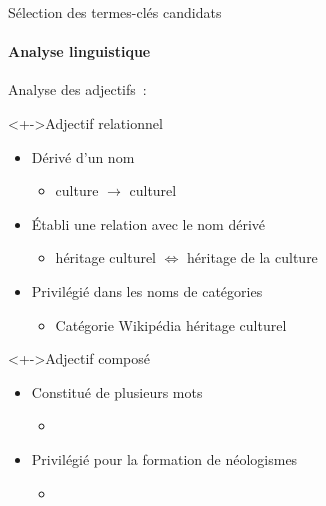   \begin{frame}[t]{Sélection des termes-clés candidats}\framesubtitle{Analyse linguistique}
    Analyse des adjectifs~:

    \begin{block}<+->{Adjectif relationnel}
      \begin{itemize}
        \item{Dérivé d'un nom}
        \begin{itemize}
          \item{\og{}culture\fg{} $\rightarrow$ \og{}culturel\fg{}}
        \end{itemize}
        \item{Établi une relation avec le nom dérivé}
        \begin{itemize}
          \item{\og{}héritage culturel\fg{} $\Leftrightarrow$ \og{}héritage de
                la culture\fg{}}
        \end{itemize}
        \item{Privilégié dans les noms de catégories}
        \begin{itemize}
          \item{Catégorie Wikipédia \og{}héritage culturel\fg{}}
        \end{itemize}
      \end{itemize}
    \end{block}

    \begin{block}<+->{Adjectif composé}
      \begin{itemize}
        \item{Constitué de plusieurs mots}
        \begin{itemize}
          \item{}
        \end{itemize}
        \item{Privilégié pour la formation de néologismes}
        \begin{itemize}
          \item{}
        \end{itemize}
      \end{itemize}
    \end{block}
  \end{frame}

